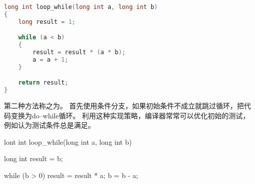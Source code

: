 {{{            %
            \begin{practicec}
                \begin{lstlisting}[language=C]
long int loop_while(long int a, long int b)
{
    long result = 1;

    while (a < b)
    {
        result = result * (a * b);
        a = a + 1;
    }

    return result;
}
                \end{lstlisting}
            \end{practicec}

            第二种方法称之为。
            首先使用条件分支，如果初始条件不成立就跳过循环，把代码变换为do--while循环。
            利用这种实现策略，编译器常常可以优化初始的测试，例如认为测试条件总是满足。

            \begin{practicec}
lont int loop_while(long int a, long int b)
{
    long int result = b;

    while (b > 0)
    {
        result = result * a;
        b = b - a;
    }
}
            \end{practicec}
        }
    }
}

